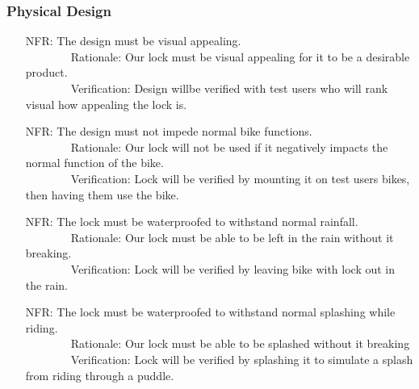 \documentclass[12pt]{article}
\newcounter{nfrnum} %
\begin{document}
\subsubsection{Physical Design}
\begin{itemize}
\setlength{\itemindent}{.5in}
\item[NFR\refstepcounter{nfrnum}\thenfrnum\label{NFR4}:] The design must be visual appealing.
\\ \-\ \-\ \-\ \-\ \-\ \-\ \-\ \-\ Rationale: Our lock must be visual appealing for it to be a desirable product.
\\ \-\ \-\ \-\ \-\ \-\ \-\ \-\ \-\ Verification: Design willbe verified with test users who will rank visual how appealing the lock is.
\item[NFR\refstepcounter{nfrnum}\thenfrnum\label{NFR5}:] The design must not impede normal bike functions.
\\ \-\ \-\ \-\ \-\ \-\ \-\ \-\ \-\ Rationale: Our lock will not be used if it negatively impacts the normal function of the bike.
\\ \-\ \-\ \-\ \-\ \-\ \-\ \-\ \-\ Verification: Lock will be verified by mounting it on test users bikes, then having them use the bike.
\item[NFR\refstepcounter{nfrnum}\thenfrnum\label{NFR6}:] The lock must be waterproofed to withstand normal rainfall.
\\ \-\ \-\ \-\ \-\ \-\ \-\ \-\ \-\ Rationale: Our lock must be able to be left in the rain without it breaking.
\\ \-\ \-\ \-\ \-\ \-\ \-\ \-\ \-\ Verification: Lock will be verified by leaving bike with lock out in the rain.
\item[NFR\refstepcounter{nfrnum}\thenfrnum\label{NFR7}:] The lock must be waterproofed to withstand normal splashing while riding.
\\ \-\ \-\ \-\ \-\ \-\ \-\ \-\ \-\ Rationale: Our lock must be able to be splashed without it breaking
\\ \-\ \-\ \-\ \-\ \-\ \-\ \-\ \-\ Verification: Lock will be verified by splashing it to simulate a splash from riding through a puddle.

\end{itemize}
\end{document}
